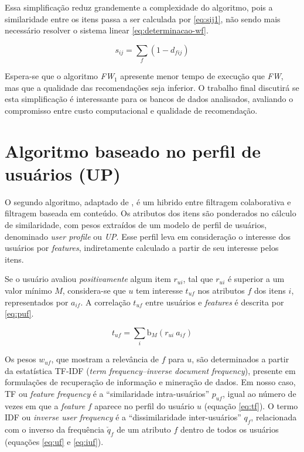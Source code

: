 Essa simplificação reduz grandemente a complexidade do algoritmo, pois a similaridade entre os itens passa a ser calculada por \ref{eq:sij1}, não sendo mais necessário  resolver o sistema linear \ref{eq:determinacao-wf}. 

\begin{equation} 
\label{eq:sij1}
    s_{ij} = \sum_{f}{\left(1-d_{fij}\right)}
\end{equation}

Espera-se que o algoritmo \textit{FW$_1$} apresente menor tempo de execução que \textit{FW}, mas que a qualidade das recomendações seja inferior. O trabalho final discutirá se esta simplificação é interessante para os bancos de dados analisados, avaliando o compromisso entre custo computacional e qualidade de recomendação.


\section{Algoritmo baseado no perfil de usuários (UP)} %
\label{sec:algoritmo_baseado_no_perfil_de_usu_rios_}


O segundo algoritmo, adaptado de \cite{debnath2008feature}, é um hibrido entre filtragem colaborativa e filtragem baseada em conteúdo. Os atributos dos itens são ponderados no cálculo de similaridade, com pesos extraídos de um modelo de perfil de usuários, denominado \textit{user profile} ou \textit{UP}. Esse perfil leva em consideração o interesse dos usuários por \textit{features}, indiretamente calculado a partir de seu interesse pelos itens. 

Se o usuário avaliou \textit{positivamente} algum item $r_{ui}$, tal que $r_{ui}$ é superior a um valor mínimo $M$, considera-se que $u$ tem interesse $t_{uf}$ nos atributos $f$ dos itens $i$, representados por $a_{if}$. A correlação $t_{uf}$ entre usuários e \textit{features} é descrita por \ref{eq:puf}.

\begin{equation}
\label{eq:puf} 
    t_{uf} = \sum_{i}{\mathrm{b}_M\left(r_{ui}~a_{if}\right)} 
\end{equation} 

Os pesos $w_{uf}$, que mostram a relevância de $f$ para $u$, são determinados a partir da estatística TF-IDF (\textit{term frequency--inverse document frequency}), presente em formulações de recuperação de informação e mineração de dados. Em nosso caso, TF ou \textit{feature frequency} é a ``similaridade intra-usuários'' $p_{uf}$, igual ao número de vezes em que a \textit{feature} $f$ aparece no perfil do usuário $u$ (equação \ref{eq:tf}). O termo IDF ou \textit{inverse user frequency} é a ``dissimilaridade inter-usuários'' $q_{f}$, relacionada com o inverso da frequência $\check{q}_{f}$ de um atributo $f$ dentro de todos os usuários (equações \ref{eq:uf} e \ref{eq:iuf}).

